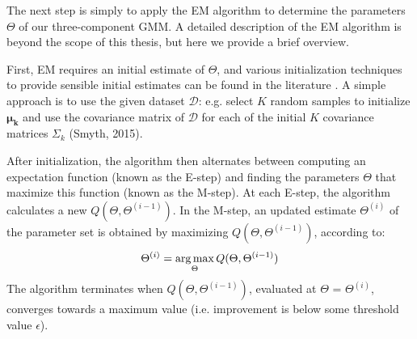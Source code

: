 The next step is simply to apply the EM algorithm to determine the parameters $\Theta$ of our three-component GMM. A detailed description of the EM algorithm is beyond the scope of this thesis, but here we provide a brief overview.

First, EM requires an initial estimate of $\Theta$, and various initialization techniques to provide sensible initial estimates can be found in the literature . A simple approach is to use the given dataset $\mathcal{D}$: e.g. select $K$ random samples to initialize $\boldsymbol{\mu_k}$ and use the covariance matrix of $\mathcal{D}$ for each of the initial $K$ covariance matrices $\Sigma_k$ (Smyth, 2015).

After initialization, the algorithm then alternates between computing an expectation function (known as the E-step) and finding the parameters $\Theta$ that maximize this function (known as the M-step). At each E-step, the algorithm calculates a new $Q(\Theta,\Theta^{(i-1)})$. In the M-step, an updated estimate $\Theta^{(i)}$ of the parameter set is obtained by maximizing $Q(\Theta,\Theta^{(i-1)})$, according to:
%
\begin{equation}
 \Theta^{(i)} = \operatorname*{arg\,max}_\Theta{Q(\Theta,\Theta^{(i-1)})}
\end{equation}
%
The algorithm terminates when $Q(\Theta,\Theta^{(i-1)})$, evaluated at $\Theta$ = $\Theta^{(i)}$, converges towards a maximum value (i.e. improvement is below some threshold value $\epsilon$).

